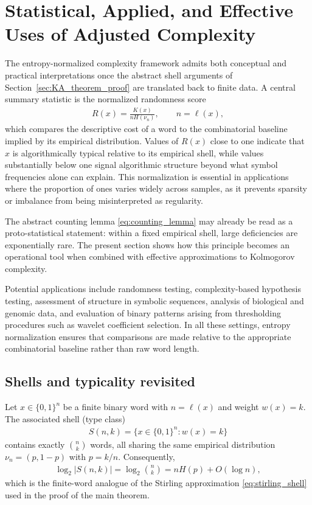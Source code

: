 \documentclass[12pt]{article}
\newcommand{\be}{\begin{eqnarray}}
\newcommand{\ee}{\end{eqnarray}}
\begin{document}
\section{Statistical, Applied, and Effective Uses of Adjusted Complexity}
\label{sec:stat_effective_uses}

The entropy-normalized complexity framework admits both conceptual and practical
interpretations once the abstract shell arguments of
Section~\ref{sec:KA_theorem_proof} are translated back to finite data.
A central summary statistic is the normalized randomness score
\be
R(x)=\frac{K(x)}{nH(\nu_n)}, \qquad n=\ell(x),
\label{eq:R_stat_section_clean}
\ee
which compares the descriptive cost of a word to the combinatorial baseline
implied by its empirical distribution. Values of $R(x)$ close to one indicate
that $x$ is algorithmically typical relative to its empirical shell, while
values substantially below one signal algorithmic structure beyond what symbol
frequencies alone can explain. This normalization is essential in applications
where the proportion of ones varies widely across samples, as it prevents
sparsity or imbalance from being misinterpreted as regularity.

The abstract counting lemma \eqref{eq:counting_lemma} may already be read as a
proto-statistical statement: within a fixed empirical shell, large deficiencies
are exponentially rare. The present section shows how this principle becomes an
operational tool when combined with effective approximations to Kolmogorov
complexity.

Potential applications include randomness testing, complexity-based hypothesis
testing, assessment of structure in symbolic sequences, analysis of biological
and genomic data, and evaluation of binary patterns arising from thresholding
procedures such as wavelet coefficient selection. In all these settings,
entropy normalization ensures that comparisons are made relative to the
appropriate combinatorial baseline rather than raw word length.

\subsection*{Shells and typicality revisited}

Let $x\in\{0,1\}^n$ be a finite binary word with $n=\ell(x)$ and weight $w(x)=k$.
The associated shell (type class)
\be
S(n,k)=\{x\in\{0,1\}^n:w(x)=k\}
\ee
contains exactly $\binom{n}{k}$ words, all sharing the same empirical
distribution $\nu_n=(p,1-p)$ with $p=k/n$. Consequently,
\be
\log_2|S(n,k)|=\log_2\binom{n}{k}
= nH(p)+O(\log n),
\ee
which is the finite-word analogue of the Stirling approximation
\eqref{eq:stirling_shell} used in the proof of the main theorem.
\end{document}
